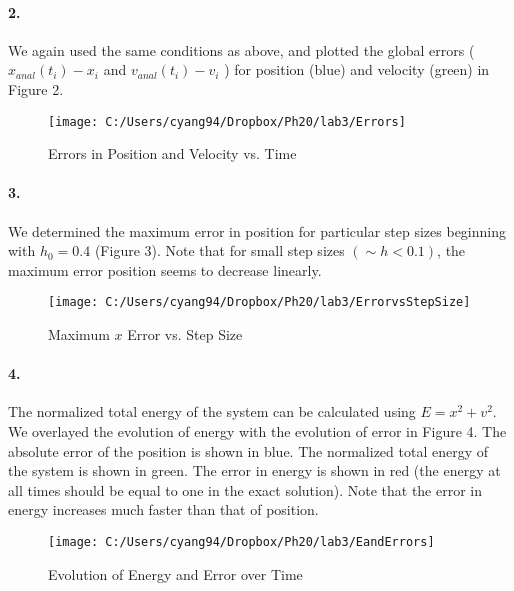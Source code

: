 \documentclass[english]{article}
\begin{document}
\paragraph{2.}

We again used the same conditions as above, and plotted the global
errors ($x_{anal}(t_{i})-x_{i}$ and $v_{anal}(t_{i})-v_{i}$ ) for
position (blue) and velocity (green) in Figure 2.

\begin{figure}[H]
\caption{Errors in Position and Velocity vs. Time}


\noindent \centering{}\texttt{[image: C:/Users/cyang94/Dropbox/Ph20/lab3/Errors]}
\end{figure}



\paragraph{3.}

We determined the maximum error in position for particular step sizes
beginning with $h_{0}=0.4$ (Figure 3). Note that for small step sizes
$(\sim h<0.1)$, the maximum error position seems to decrease linearly.

\begin{figure}[H]
\caption{Maximum $x$ Error vs. Step Size}


\noindent \centering{}\texttt{[image: C:/Users/cyang94/Dropbox/Ph20/lab3/ErrorvsStepSize]}
\end{figure}



\paragraph{4.}

The normalized total energy of the system can be calculated using
$E=x^{2}+v^{2}$. We overlayed the evolution of energy with the evolution
of error in Figure 4. The absolute error of the position is shown
in blue. The normalized total energy of the system is shown in green.
The error in energy is shown in red (the energy at all times should
be equal to one in the exact solution). Note that the error in energy
increases much faster than that of position.

\begin{figure}[H]


\caption{Evolution of Energy and Error over Time}


\noindent \centering{}\texttt{[image: C:/Users/cyang94/Dropbox/Ph20/lab3/EandErrors]}
\end{figure}
\end{document}
